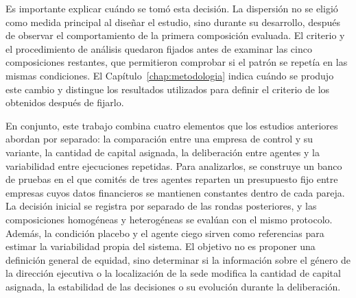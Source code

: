 Es importante explicar cuándo se tomó esta decisión. La dispersión no se eligió como medida principal al diseñar el estudio, sino durante su desarrollo, después de observar el comportamiento de la primera composición evaluada. El criterio y el procedimiento de análisis quedaron fijados antes de examinar las cinco composiciones restantes, que permitieron comprobar si el patrón se repetía en las mismas condiciones. El Capítulo~\ref{chap:metodologia} indica cuándo se produjo este cambio y distingue los resultados utilizados para definir el criterio de los obtenidos después de fijarlo.

En conjunto, este trabajo combina cuatro elementos que los estudios anteriores abordan por separado: la comparación entre una empresa de control y su variante, la cantidad de capital asignada, la deliberación entre agentes y la variabilidad entre ejecuciones repetidas. Para analizarlos, se construye un banco de pruebas en el que comités de tres agentes reparten un presupuesto fijo entre empresas cuyos datos financieros se mantienen constantes dentro de cada pareja. La decisión inicial se registra por separado de las rondas posteriores, y las composiciones homogéneas y heterogéneas se evalúan con el mismo protocolo. Además, la condición placebo y el agente ciego sirven como referencias para estimar la variabilidad propia del sistema. El objetivo no es proponer una definición general de equidad, sino determinar si la información sobre el género de la dirección ejecutiva o la localización de la sede modifica la cantidad de capital asignada, la estabilidad de las decisiones o su evolución durante la deliberación.